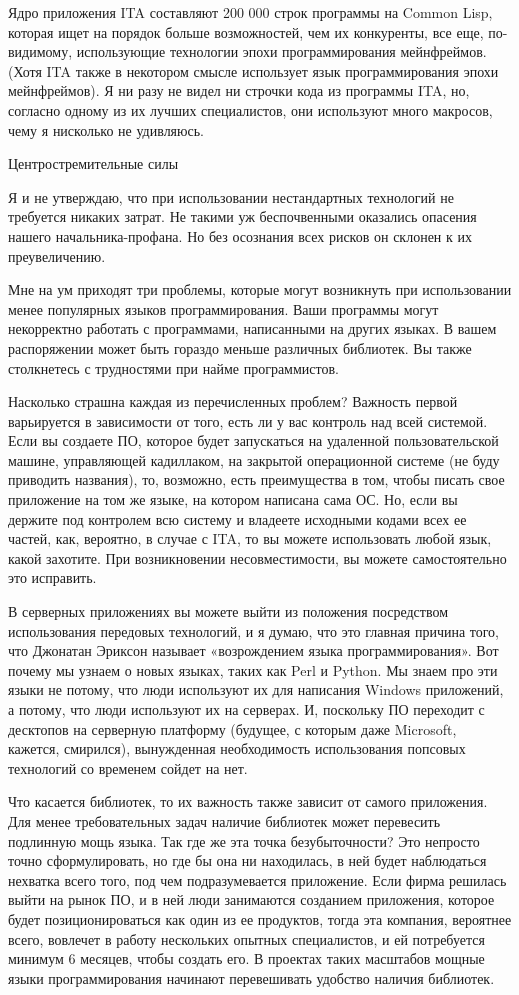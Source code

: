 \documentclass[ebook,12pt,oneside,openany]{memoir}
\begin{document}
Ядро приложения ITA составляют 200 000 строк программы на Common Lisp,
которая ищет на порядок больше возможностей, чем их конкуренты, все
еще, по-видимому, использующие технологии эпохи программирования
мейнфреймов. (Хотя ITA также в некотором смысле использует язык
программирования эпохи мейнфреймов). Я ни разу не видел ни строчки
кода из программы ITA, но, согласно одному из их лучших специалистов,
они используют много макросов, чему я нисколько не удивляюсь.

Центростремительные силы

Я и не утверждаю, что при использовании нестандартных технологий не
требуется никаких затрат. Не такими уж беспочвенными оказались
опасения нашего начальника-профана. Но без осознания всех рисков он
склонен к их преувеличению.


Мне на ум приходят три проблемы, которые могут возникнуть при
использовании менее популярных языков программирования. Ваши программы
могут некорректно работать с программами, написанными на других
языках. В вашем распоряжении может быть гораздо меньше различных
библиотек. Вы также столкнетесь с трудностями при найме программистов.

Насколько страшна каждая из перечисленных проблем? Важность первой
варьируется в зависимости от того, есть ли у вас контроль над всей
системой. Если вы создаете ПО, которое будет запускаться на удаленной
пользовательской машине, управляющей кадиллаком, на закрытой
операционной системе (не буду приводить названия), то, возможно, есть
преимущества в том, чтобы писать свое приложение на том же языке, на
котором написана сама ОС. Но, если вы держите под контролем всю
систему и владеете исходными кодами всех ее частей, как, вероятно, в
случае с ITA, то вы можете использовать любой язык, какой захотите.
При возникновении несовместимости, вы можете самостоятельно это
исправить.

В серверных приложениях вы можете выйти из положения посредством
использования передовых технологий, и я думаю, что это главная причина
того, что Джонатан Эриксон называет «возрождением языка
программирования». Вот почему мы узнаем о новых языках, таких как Perl
и Python. Мы знаем про эти языки не потому, что люди используют их для
написания Windows приложений, а потому, что люди используют их на
серверах. И, поскольку ПО переходит с десктопов на серверную платформу
(будущее, с которым даже Microsoft, кажется, смирился), вынужденная
необходимость использования попсовых технологий со временем сойдет на
нет.

Что касается библиотек, то их важность также зависит от самого
приложения. Для менее требовательных задач наличие библиотек может
перевесить подлинную мощь языка. Так где же эта точка безубыточности?
Это непросто точно сформулировать, но где бы она ни находилась, в ней
будет наблюдаться нехватка всего того, под чем подразумевается
приложение. Если фирма решилась выйти на рынок ПО, и в ней люди
занимаются созданием приложения, которое будет позиционироваться как
один из ее продуктов, тогда эта компания, вероятнее всего, вовлечет в
работу нескольких опытных специалистов, и ей потребуется минимум 6
месяцев, чтобы создать его. В проектах таких масштабов мощные языки
программирования начинают перевешивать удобство наличия библиотек.
\end{document}
